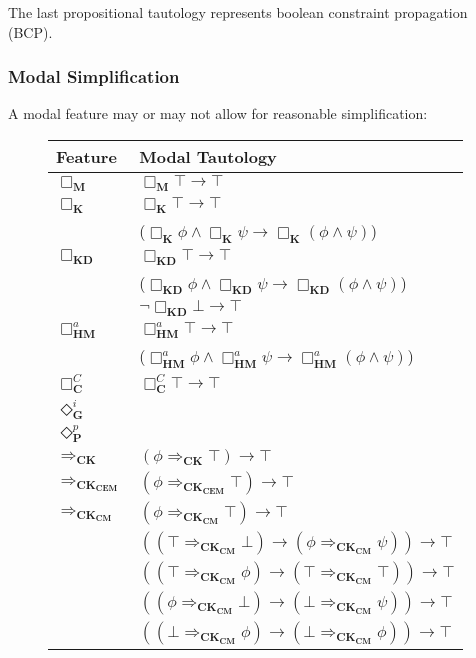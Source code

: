 \documentclass{llncs}
\begin{document}
The last propositional tautology represents boolean constraint propagation (BCP).

\subsubsection{Modal Simplification}

A modal feature may or may not allow for reasonable simplification:

\begin{footnotesize}
\begin{figure}[!h]
  \begin{center}
\begin{tabular}{| l | l |}
\hline
Feature & Modal Tautology \\
\hline
$\Box_\mathbf{M}$ & $\Box_\mathbf{M}\top\rightarrow \top$ \\
\hline
$\Box_\mathbf{K}$ &  $\Box_\mathbf{K}\top\rightarrow \top$ \\
 & ($\Box_\mathbf{K}\phi\wedge\Box_\mathbf{K}\psi\rightarrow \Box_\mathbf{K}(\phi\wedge\psi)$) \\
\hline
$\Box_\mathbf{KD}$ & $\Box_\mathbf{KD}\top\rightarrow \top$ \\
 & ($\Box_\mathbf{KD}\phi\wedge\Box_\mathbf{KD}\psi\rightarrow \Box_\mathbf{KD}(\phi\wedge\psi)$) \\
 & $\neg\Box_\mathbf{KD}\bot\rightarrow \top$ \\
\hline
$\Box^a_\mathbf{HM}$ &  $\Box^a_\mathbf{HM}\top\rightarrow \top$ \\
 & ($\Box^a_\mathbf{HM}\phi\wedge\Box^a_\mathbf{HM}\psi\rightarrow \Box^a_\mathbf{HM}(\phi\wedge\psi)$) \\
\hline
$\Box^C_\mathbf{C}$ & $\Box^C_\mathbf{C}\top\rightarrow \top$ \\
\hline
$\Diamond^i_\mathbf{G}$ &  \\
\hline
$\Diamond^p_\mathbf{P}$ &  \\
\hline
$\Rightarrow_\mathbf{CK}$ & $(\phi\Rightarrow_\mathbf{CK}\top)\rightarrow\top$ \\
\hline
$\Rightarrow_\mathbf{CK_{CEM}}$ & $(\phi\Rightarrow_\mathbf{CK_{CEM}}\top)\rightarrow\top$ \\
\hline
$\Rightarrow_\mathbf{CK_{CM}}$ & $(\phi\Rightarrow_\mathbf{CK_{CM}}\top)\rightarrow\top$ \\
                               & $((\top\Rightarrow_\mathbf{CK_{CM}}\bot)\rightarrow(\phi\Rightarrow_\mathbf{CK_{CM}}\psi))\rightarrow \top$ \\
                               & $((\top\Rightarrow_\mathbf{CK_{CM}}\phi)\rightarrow(\top\Rightarrow_\mathbf{CK_{CM}}\top))\rightarrow \top$ \\
                               & $((\phi\Rightarrow_\mathbf{CK_{CM}}\bot)\rightarrow(\bot\Rightarrow_\mathbf{CK_{CM}}\psi))\rightarrow \top$ \\
                               & $((\bot\Rightarrow_\mathbf{CK_{CM}}\phi)\rightarrow(\bot\Rightarrow_\mathbf{CK_{CM}}\phi))\rightarrow \top$ \\


\end{tabular}
\end{center}
\end{figure}
\end{footnotesize}
\end{document}
